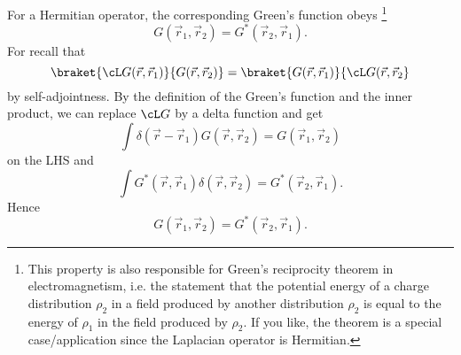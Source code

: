 For a Hermitian operator, the corresponding Green's function obeys%
    \footnote{This property is also responsible for Green's reciprocity theorem in electromagnetism, i.e. the statement that the potential energy of a charge distribution $\rho_2$ in a field produced by another distribution $\rho_2$ is equal to the energy of $\rho_1$ in the field produced by $\rho_2$. If you like, the theorem is a special case/application since the Laplacian operator is Hermitian.}
\begin{equation}
    G(\vec r_1, \vec r_2) = G^*(\vec r_2, \vec r_1).
\end{equation}
For recall that
\begin{equation}
    \braket{\cL G(\vec r, \vec r_1)}{G(\vec r, \vec r_2)} = \braket{G(\vec r, \vec r_1)}{\cL G(\vec r, \vec r_2}
\end{equation}
by self-adjointness. By the definition of the Green's function and the inner product, we can replace $\cL G$ by a delta function and get
\begin{equation}
    \int \delta (\vec r - \vec r_1) G(\vec r, \vec r_2) = G(\vec r_1, \vec r_2)
\end{equation}
on the LHS and
\begin{equation}
    \int G^*(\vec r, \vec r_1) \delta(\vec r, \vec r_2) = G^*(\vec r_2, \vec r_1).
\end{equation}
Hence
\begin{equation}
    G(\vec r_1, \vec r_2) = G^*(\vec r_2,\vec r_1).
\end{equation}


